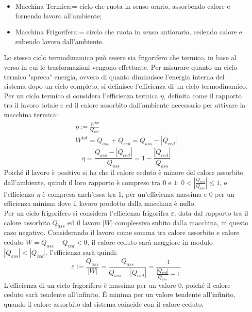 \documentclass{article}
\numberwithin{equation}{subsection}
\begin{document}
\begin{itemize}
    \item Macchina Termica:= ciclo che ruota in senso orario, 
    assorbendo calore e fornendo lavoro all'ambiente;
    \item Macchina Frigorifera:= circlo che ruota in senso 
    antiorario, cedendo calore e subendo lavoro dall'ambiente.
\end{itemize}
Lo stesso ciclo termodinamico può essere sia frigorifero che 
termico, in base al verso in cui le trasformazioni vengono 
effettuate. Per misurare quanto un ciclo termico "spreca" 
energia, ovvero di quanto diminuisce l'energia interna del 
sistema dopo un ciclo completo, si definisce l'efficienza di 
un ciclo termodinamico. 
Per un ciclo termico si considera l'efficienza termica $\eta$, 
definita come il rapporto tra il lavoro totale e ed il 
calore assorbito dall'ambiente necessario per attivare la 
macchina termica:
\begin{gather*}
    \eta:=\displaystyle\frac{W^{tot}}{Q_{ass}}\\
    W^{tot}=Q_{ass}+Q_{ced}=Q_{ass}-\left|Q_{ced}\right|
\end{gather*}
\begin{equation}
    \eta=\displaystyle\frac{Q_{ass}-\left|Q_{ced}\right|}{Q_{ass}}=1-\frac{\left|Q_{ced}\right|}{Q_{ass}}
\end{equation}
Poiché il lavoro è positivo si ha che il calore ceduto  
è minore del calore assorbito dall'ambiente, quindi il loro 
rapporto è compreso tra $0$ e $1$: $0<\left|\displaystyle\frac{Q_{ced}}{Q_{ass}}\right|\leq1$, 
e l'efficienza $\eta$ è compresa anch'essa tra $1$, per 
un'efficienza massima e $0$ per un efficienza minima dove il 
lavoro prodotto dalla macchina è nullo.
\\
Per un ciclo frigorifero si considera l'efficienza frigorifra $\varepsilon$, 
data dal rapporto tra il calore assorbito $Q_{ass}$ ed il lavoro 
$\left|W\right|$ complessivo subito dalla macchina, in questo caso negativo. 
Considerando il lavoro come somma tra calore assorbito e calore 
ceduto $W=Q_{ass}+Q_{ced}<0$, il calore ceduto sarà maggiore in modulo 
$\left|Q_{ass}\right|<\left|Q_{ced}\right|$, l'efficienza sarà 
quindi:
\begin{equation}
    \varepsilon:=\displaystyle\frac{Q_{ass}}{\left|W\right|}=\displaystyle\frac{Q_{ass}}{Q_{ass}-\left|Q_{ced}\right|}=\frac{1}{\displaystyle\frac{|Q_{ced}|}{Q_{ass}}-1}
\end{equation}
L'efficienza di un ciclo frigorifero è massima per un valore $0$, poiché il calore 
ceduto sarà tendente all'infinito. \'{E} minima 
per un valore tendente all'infinito, quando il calore assorbito 
dal sistema coincide con il calore ceduto. 
\end{document}
